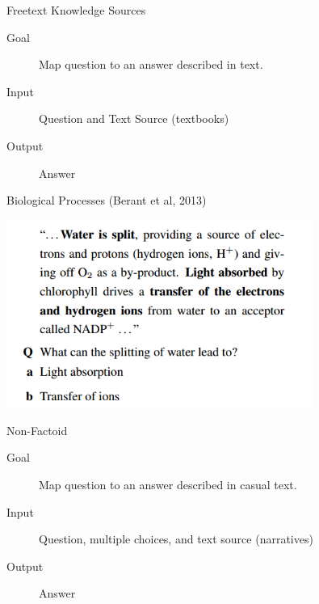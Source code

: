 \documentclass{beamer}
\begin{document}
\begin{frame}{Freetext Knowledge Sources}

  \begin{description}
  \item[Goal]Map question to an answer described in text.
  \item[Input] Question and Text Source (textbooks)
  \item[Output] Answer
  \end{description}
\end{frame}


\begin{frame}{Biological Processes (Berant et al, 2013)}
  \begin{center}
    \includegraphics[width=10cm]{water}
  \end{center}
\end{frame}

  

\begin{frame}{Non-Factoid}
  \begin{description}
  \item[Goal]Map question to an answer described in casual text.
  \item[Input] Question, multiple choices, and text source (narratives)
  \item[Output] Answer
  \end{description}  
\end{frame}
\end{document}
